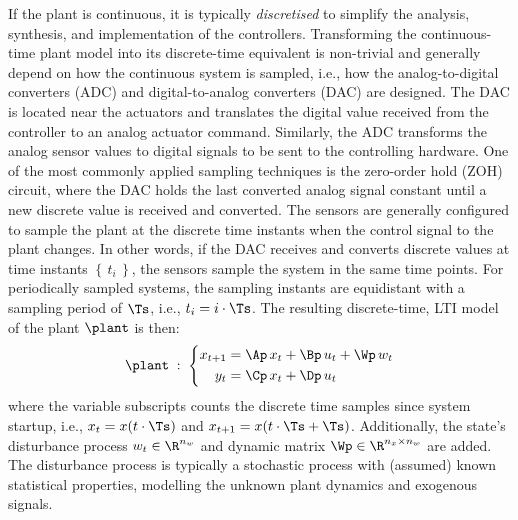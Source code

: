 If the plant is continuous, it is typically \emph{discretised} to simplify the analysis, synthesis, and implementation of the controllers.
Transforming the continuous-time plant model into its discrete-time equivalent is non-trivial and generally depend on how the continuous system is sampled, i.e., how the analog-to-digital converters (ADC) and digital-to-analog converters (DAC) are designed.
The DAC is located near the actuators and translates the digital value received from the controller to an analog actuator command.
Similarly, the ADC transforms the analog sensor values to digital signals to be sent to the controlling hardware.
One of the most commonly applied sampling techniques is the zero-order hold (ZOH) circuit, where the DAC holds the last converted analog signal constant until a new discrete value is received and converted.
The sensors are generally configured to sample the plant at the discrete time instants when the control signal to the plant changes.
In other words, if the DAC receives and converts discrete values at time instants $\left\{\, t_i \,\right\}$, the sensors sample the system in the same time points.
For periodically sampled systems, the sampling instants are equidistant with a sampling period of $\Ts$, i.e., $t_i = i\cdot \Ts$.
The resulting discrete-time, LTI model of the plant $\plant$ is then:
%
\newline{}
%
\begin{equation}%
    \label{eq:discrete-lti-plant}%
    \plant \; : \; \left\{\begin{aligned}
        x_{t+1} &= \Ap\,x_t + \Bp\,u_t + \Wp\, w_t\\
        y_t &= \Cp\,x_t + \Dp\,u_t \\
    \end{aligned}\right.
\end{equation}
%
where the variable subscripts counts the discrete time samples since system startup, i.e., $x_t = x(t\cdot \Ts)$ and $x_{t+1} = x(t\cdot \Ts + \Ts)$.
Additionally, the state's disturbance process $w_t \in \R^{n_w}$ and dynamic matrix $\Wp \in \R^{n_x \times n_w}$ are added.
The disturbance process is typically a stochastic process with (assumed) known statistical properties, modelling the unknown plant dynamics and exogenous signals.

